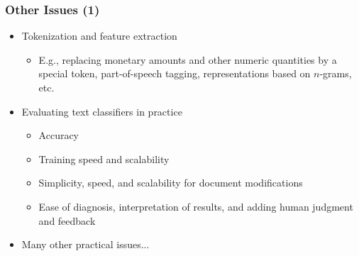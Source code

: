 \documentclass{beamer}
\begin{document}
\begin{frame}
    \frametitle{Other Issues (1)}

    \begin{itemize}
    \item Tokenization and feature extraction
        \begin{itemize}
        \item E.g., replacing monetary amounts and other numeric quantities by a special token, part-of-speech tagging, representations based on $n$-grams, etc.
        \end{itemize}
    
    \item Evaluating text classifiers in practice
     \begin{itemize}
     \item Accuracy
     \item Training speed and scalability
     \item Simplicity, speed, and scalability for document modifications
     \item Ease of diagnosis, interpretation of results, and adding human judgment and feedback
    \end{itemize}
  \end{itemize}
  \begin{itemize}
  \item Many other practical issues...
  \end{itemize}
\end{frame}


\end{document}
